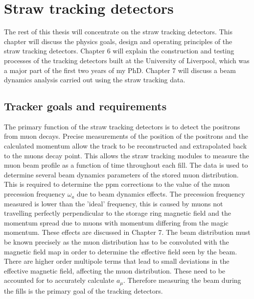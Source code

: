 \chapter{Straw tracking detectors} %
\label{Chapter4} 

The rest of this thesis will concentrate on the straw tracking detectors. This chapter will discuss the physics goals, design and operating principles of the straw tracking detectors. Chapter 6 will explain the construction and testing processes of the tracking detectors built at the University of Liverpool, which was a major part of the first two years of my PhD. Chapter 7 will discuss a beam dynamics analysis carried out using the straw tracking data. 

\section{Tracker goals and requirements}
The primary function of the straw tracking detectors is to detect the positrons from muon decays. Precise measurements of the position of the positrons and the calculated momentum allow the track to be reconstructed and extrapolated back to the muons decay point. This allows the straw tracking modules to measure the muon beam profile as a function of time throughout each fill. The data is used to determine several beam dynamics parameters of the stored muon distribution. This is required to determine the ppm corrections to the value of the muon precession frequency $\omega_{a}$ due to beam dynamics effects. The precession frequency measured is lower than the 'ideal' frequency, this is caused by muons not travelling perfectly perpendicular to the storage ring magnetic field and the momentum spread due to muons with momentum differing from the magic momentum. These effects are discussed in Chapter 7. The beam distribution must be known precisely as the muon distribution has to be convoluted with the magnetic field map in order to determine the effective field seen by the beam. There are higher order multipole terms that lead to small deviations in the effective magnetic field, affecting the muon distribution. These need to be accounted for to accurately calculate $a_{\mu}$. Therefore measuring the beam during the fills is the primary goal of the tracking detectors.

